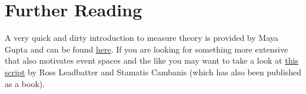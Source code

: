 \documentclass[a4paper,11pt,leqno]{report}
\begin{document}
\section*{Further Reading}
A very quick and dirty introduction to measure theory is provided by Maya Gupta and can be found 
\href{https://www.ee.washington.edu/techsite/papers/documents/UWEETR-2006-0008.pdf}{here}. If you are
looking for something more extensive that also motivates event spaces and the like you may want to 
take a look at \href{http://www.stat.ncsu.edu/people/fuentes/courses/st778/lectures/ross}{this script}
by Ross Leadbatter and Stamatis Cambanis (which has also been published as a book).
\end{document}

